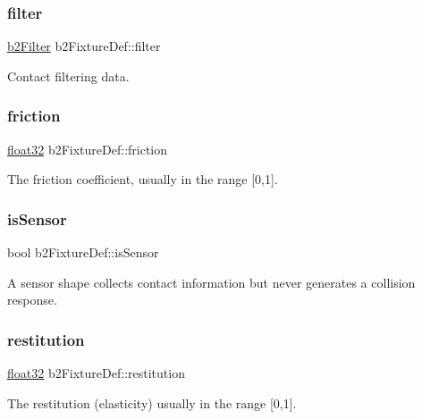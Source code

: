 \subsubsection{\texorpdfstring{filter}{filter}}
{\footnotesize\ttfamily \mbox{\hyperlink{structb2_filter}{b2\+Filter}} b2\+Fixture\+Def\+::filter}



Contact filtering data. 

\mbox{\label{structb2_fixture_def_a66081c8d0e12d4bdb0b341fb97b46eb6}} 
\subsubsection{\texorpdfstring{friction}{friction}}
{\footnotesize\ttfamily \mbox{\hyperlink{b2_settings_8h_aacdc525d6f7bddb3ae95d5c311bd06a1}{float32}} b2\+Fixture\+Def\+::friction}



The friction coefficient, usually in the range \mbox{[}0,1\mbox{]}. 

\mbox{\label{structb2_fixture_def_ac8cfcc6208663c92861eaab3b3fdc57e}} 
\subsubsection{\texorpdfstring{isSensor}{isSensor}}
{\footnotesize\ttfamily bool b2\+Fixture\+Def\+::is\+Sensor}

A sensor shape collects contact information but never generates a collision response. \mbox{\label{structb2_fixture_def_ad7ee26656e4749f7b548d2cc0cf9f168}} 
\subsubsection{\texorpdfstring{restitution}{restitution}}
{\footnotesize\ttfamily \mbox{\hyperlink{b2_settings_8h_aacdc525d6f7bddb3ae95d5c311bd06a1}{float32}} b2\+Fixture\+Def\+::restitution}



The restitution (elasticity) usually in the range \mbox{[}0,1\mbox{]}. 

